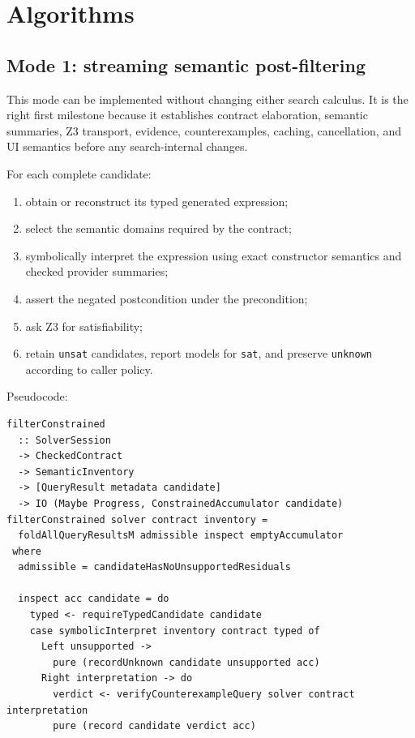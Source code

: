 \documentclass[11pt,oneside]{article}
\newcommand{\code}[1]{\texttt{#1}}
\begin{document}
\section{Algorithms}

\subsection{Mode 1: streaming semantic post-filtering}

This mode can be implemented without changing either search calculus. It is the right
first milestone because it establishes contract elaboration, semantic summaries, Z3
transport, evidence, counterexamples, caching, cancellation, and UI semantics before
any search-internal changes.

For each complete candidate:

\begin{enumerate}
  \item obtain or reconstruct its typed generated expression;
  \item select the semantic domains required by the contract;
  \item symbolically interpret the expression using exact constructor semantics and
        checked provider summaries;
  \item assert the negated postcondition under the precondition;
  \item ask Z3 for satisfiability;
  \item retain \code{unsat} candidates, report models for \code{sat}, and preserve
        \code{unknown} according to caller policy.
\end{enumerate}

Pseudocode:

\begin{lstlisting}[language=HaskellExt,caption={Streaming post-filtering over existing result batches}]
filterConstrained
  :: SolverSession
  -> CheckedContract
  -> SemanticInventory
  -> [QueryResult metadata candidate]
  -> IO (Maybe Progress, ConstrainedAccumulator candidate)
filterConstrained solver contract inventory =
  foldAllQueryResultsM admissible inspect emptyAccumulator
 where
  admissible = candidateHasNoUnsupportedResiduals

  inspect acc candidate = do
    typed <- requireTypedCandidate candidate
    case symbolicInterpret inventory contract typed of
      Left unsupported ->
        pure (recordUnknown candidate unsupported acc)
      Right interpretation -> do
        verdict <- verifyCounterexampleQuery solver contract interpretation
        pure (record candidate verdict acc)
\end{lstlisting}
\end{document}
